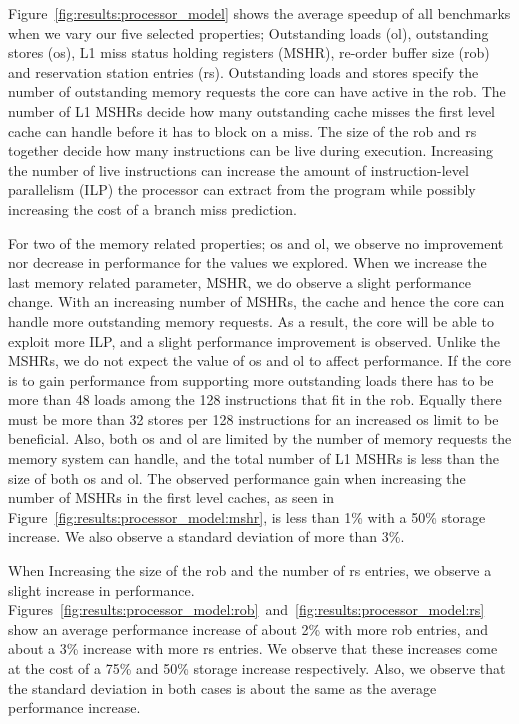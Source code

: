 Figure~\ref{fig:results:processor_model} shows the average speedup of all benchmarks when we vary our five selected properties; Outstanding loads (ol), outstanding stores (os), L1 miss status holding registers (MSHR), re-order buffer size (rob) and reservation station entries (rs).
Outstanding loads and stores specify the number of outstanding memory requests the core can have active in the rob.
The number of L1 MSHRs decide how many outstanding cache misses the first level cache can handle before it has to block on a miss.
The size of the rob and rs together decide how many instructions can be live during execution.  
Increasing the number of live instructions can increase the amount of instruction-level parallelism (ILP) the processor can extract from the program while possibly increasing the cost of a branch miss prediction.

For two of the memory related properties; os and ol, we observe no improvement nor decrease in performance for the values we explored.
When we increase the last memory related parameter, MSHR, we do observe a slight performance change.
With an increasing number of MSHRs, the cache and hence the core can handle more outstanding memory requests. 
As a result, the core will be able to exploit more ILP, and a slight performance improvement is observed. 
Unlike the MSHRs, we do not expect the value of os and ol to affect performance. 
If the core is to gain performance from supporting more outstanding loads there has to be more than 48 loads among the 128 instructions that fit in the rob. 
Equally there must be more than 32 stores per 128 instructions for an increased os limit to be beneficial.
Also, both os and ol are limited by the number of memory requests the memory system can handle, and the total number of L1 MSHRs is less than the size of both os and ol.
The observed performance gain when increasing the number of MSHRs in the first level caches, as seen in Figure~\ref{fig:results:processor_model:mshr}, is less than 1\% with a 50\% storage increase. 
We also observe a standard deviation of more than 3\%. 

When Increasing the size of the rob and the number of rs entries, we observe a slight increase in performance.
Figures~\ref{fig:results:processor_model:rob}~and~\ref{fig:results:processor_model:rs} show an average performance increase of about 2\% with more rob entries, and about a 3\% increase with more rs entries.
We observe that these increases come at the cost of a 75\% and 50\% storage increase respectively.
Also, we observe that the standard deviation in both cases is about the same as the average performance increase.

